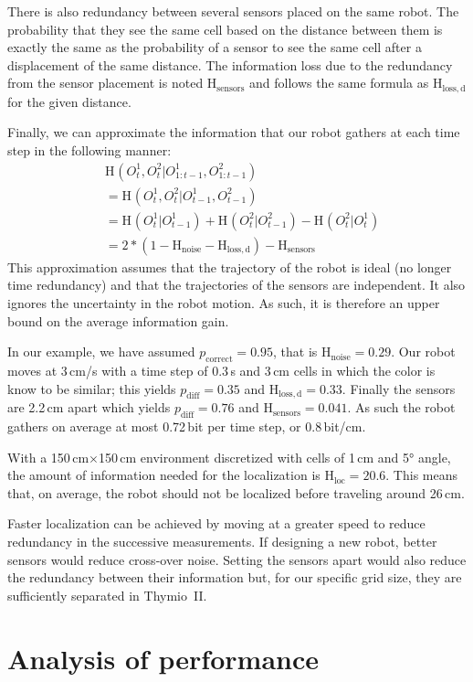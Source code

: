 \documentclass[letterpaper, 10pt, conference]{ieeeconf}
\newcommand{\ent}[1]{\mathrm{H}_\mathrm{#1}} %
\begin{document}
There is also redundancy between several sensors placed on the same robot.
The probability that they see the same cell based on the distance between them is exactly the same as the probability of a sensor to see the same cell after a displacement of the same distance.
The information loss due to the redundancy from the sensor placement is noted $\ent{sensors}$ and follows the same formula as $\ent{loss,d}$ for the given distance.

Finally, we can approximate the information that our robot gathers at each time step in the following manner:
\begin{align*}
	&\ent{}(O^1_t, O^2_t | O^1_{1:t-1}, O^2_{1:t-1})\\
	&= \ent{}(O^1_t, O^2_t | O^1_{t-1}, O^2_{t-1}) \\
	&= \ent{}(O^1_t | O^1_{t-1}) + \ent{}(O^2_t | O^2_{t-1}) - \ent{}(O^2_t | O^1_t) \\
	&= 2*(1-\ent{noise}-\ent{loss,d}) - \ent{sensors}%
\end{align*}
This approximation assumes that the trajectory of the robot is ideal (no longer time redundancy) and that the trajectories of the sensors are independent.
It also ignores the uncertainty in the robot motion.
As such, it is therefore an upper bound on the average information gain.

In our example, we have assumed $p_\mathrm{correct}=0.95$, that is $\ent{noise}=0.29$.
Our robot moves at 3\,cm/s with a time step of 0.3\,s and 3\,cm cells in which the color is know to be similar; this yields $p_\mathrm{diff}=0.35$ and $\ent{loss,d}=0.33$.
Finally the sensors are 2.2\,cm apart which yields $p_\mathrm{diff}=0.76$ and $\ent{sensors}=0.041$.
As such the robot gathers on average at most 0.72\,bit per time step, or 0.8\,bit/cm.

With a 150\,cm$\times$150\,cm environment discretized with cells of 1\,cm and 5° angle, the amount of information needed for the localization is $\ent{loc}=20.6$.
This means that, on average, the robot should not be localized before traveling around 26\,cm.

Faster localization can be achieved by moving at a greater speed to reduce redundancy in the successive measurements.
If designing a new robot, better sensors would reduce cross-over noise.
Setting the sensors apart would also reduce the redundancy between their information but, for our specific grid size, they are sufficiently separated in Thymio~II.

\section{Analysis of performance}
\end{document}
